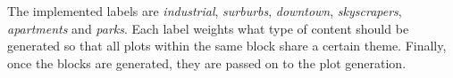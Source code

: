 The implemented labels are \textit{industrial}, \textit{surburbs}, \textit{downtown}, \textit{skyscrapers}, \textit{apartments} and \textit{parks}.
Each label weights what type of content should be generated so that all plots within the same block share a certain theme.
Finally, once the blocks are generated, they are passed on to the plot generation.